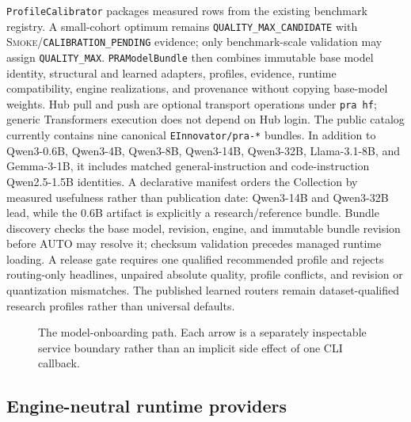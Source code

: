 \documentclass[11pt]{article}
\newcommand{\QualityMaxCandidate}{\texttt{QUALITY\_\allowbreak MAX\_\allowbreak CANDIDATE}}
\newcommand{\QualityMax}{\texttt{QUALITY\_\allowbreak MAX}}
\newcommand{\CalibrationPending}{\texttt{CALIBRATION\_\allowbreak PENDING}}
\begin{document}
\texttt{ProfileCalibrator} packages measured rows from the existing benchmark
registry. A small-cohort optimum remains \QualityMaxCandidate{} with
\textsc{Smoke}/\CalibrationPending{} evidence; only benchmark-scale validation
may assign \QualityMax{}. \texttt{PRAModelBundle} then combines immutable base
model identity, structural and learned adapters, profiles, evidence, runtime
compatibility, engine realizations, and provenance without copying base-model
weights. Hub pull and push are optional transport operations under
\texttt{pra hf}; generic Transformers execution does not depend on Hub login.
The public catalog currently contains nine canonical
\texttt{EInnovator/pra-*} bundles. In addition to Qwen3-0.6B, Qwen3-4B,
Qwen3-8B, Qwen3-14B, Qwen3-32B, Llama-3.1-8B, and Gemma-3-1B, it includes
matched general-instruction and code-instruction Qwen2.5-1.5B identities. A declarative
manifest orders the Collection by measured usefulness rather than publication
date: Qwen3-14B and Qwen3-32B lead, while the 0.6B artifact is explicitly a
research/reference bundle. Bundle discovery checks the base model,
revision, engine, and immutable bundle revision before AUTO may resolve it;
checksum validation precedes managed runtime loading. A release gate requires
one qualified recommended profile and rejects routing-only headlines,
unpaired absolute quality, profile conflicts, and revision or quantization
mismatches. The published learned routers remain dataset-qualified research
profiles rather than universal defaults.

\begin{figure}[H]
\centering
{}
\caption{The model-onboarding path. Each arrow is a separately inspectable
service boundary rather than an implicit side effect of one CLI callback.}
\label{fig:model-onboarding}
\end{figure}

\subsection{Engine-neutral runtime providers}
\end{document}
